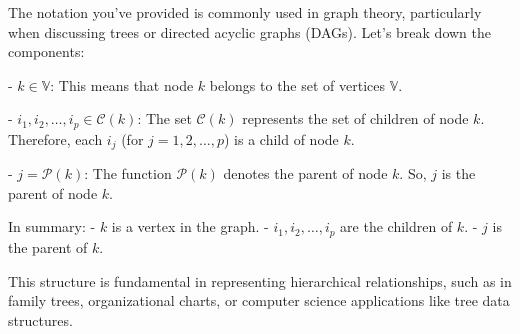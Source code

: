 The notation you've provided is commonly used in graph theory, particularly when discussing trees or directed acyclic graphs (DAGs). Let's break down the components:

- \( k \in \mathbb{V} \): This means that node \( k \) belongs to the set of vertices \( \mathbb{V} \).

- \( i_1, i_2, \ldots, i_p \in \mathcal{C}(k) \): The set \( \mathcal{C}(k) \) represents the set of children of node \( k \). Therefore, each \( i_j \) (for \( j = 1, 2, \ldots, p \)) is a child of node \( k \).

- \( j = \mathcal{P}(k) \): The function \( \mathcal{P}(k) \) denotes the parent of node \( k \). So, \( j \) is the parent of node \( k \).

In summary:
- \( k \) is a vertex in the graph.
- \( i_1, i_2, \ldots, i_p \) are the children of \( k \).
- \( j \) is the parent of \( k \).

This structure is fundamental in representing hierarchical relationships, such as in family trees, organizational charts, or computer science applications like tree data structures.